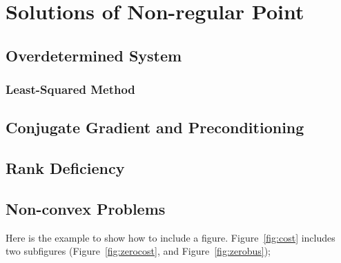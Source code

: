 \chapter{Solutions of Non-regular Point}
\label{cha:result}




\section{Overdetermined System}
\subsection{Least-Squared Method}


\section{Conjugate Gradient and Preconditioning}

\section{Rank Deficiency}


\section{Non-convex Problems}

Here is the example to show how to include a figure. Figure~\ref{fig:cost}
includes two subfigures (Figure~\ref{fig:zerocost}, and Figure~\ref{fig:zerobus});

